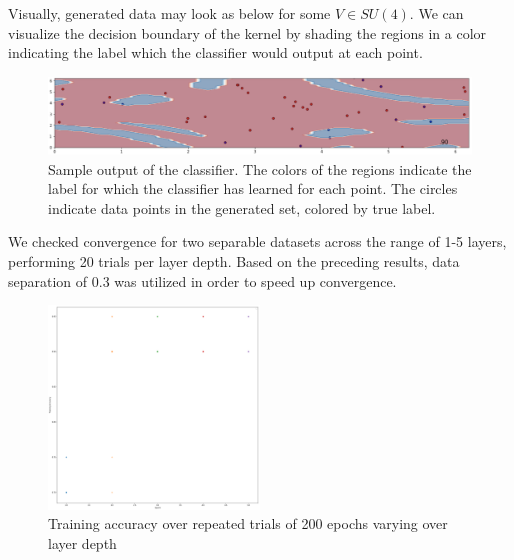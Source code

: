 \documentclass{beamer}
\newcommand\0{\mathbf{0}}
\newcommand\<{\langle}
\renewcommand\>{\rangle}
\begin{document}
\begin{frame}
Visually, generated data may look as below for some $V \in SU(4)$. We can visualize the decision boundary of the kernel by shading the regions in a color indicating the label which the classifier would output at each point.

\begin{figure}[H]
\includegraphics[width=\textwidth]{images/separable_data}
\caption{Sample output of the classifier. The colors of the regions indicate the label for which the classifier has learned for each point. The circles indicate data points in the generated set, colored by true label.}
\end{figure}
\end{frame}

\begin{frame}
We checked convergence for two separable datasets across the range of 1-5 layers, performing 20 trials per layer depth. Based on the preceding results, data separation of 0.3 was utilized in order to speed up convergence.

\begin{figure}[H]
\centering
\includegraphics[width=0.5\textwidth]{images/train_accs_layer_sep.png}	
\caption{Training accuracy over repeated trials of 200 epochs varying over layer depth}
\end{figure}
\end{frame}
\end{document}
